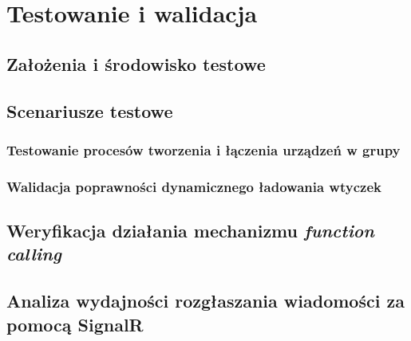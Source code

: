 \chapter{Testowanie i walidacja}
\label{cha:testowanie}

\section{Założenia i środowisko testowe}
\label{sec:srodowisko_testowe}

\section{Scenariusze testowe}
\label{sec:scenariusze_testowe}

\subsection{Testowanie procesów tworzenia i łączenia urządzeń w grupy}
\label{subsec:testy_grupy}

\subsection{Walidacja poprawności dynamicznego ładowania wtyczek}
\label{subsec:walidacja_wtyczek}

\section{Weryfikacja działania mechanizmu \textit{function calling}}
\label{sec:weryfikacja_fc}

\section{Analiza wydajności rozgłaszania wiadomości za pomocą SignalR}
\label{sec:analiza_signalr}
